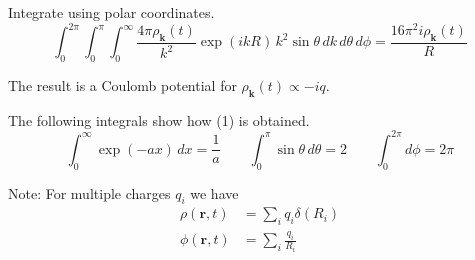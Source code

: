 


\bigskip
Integrate using polar coordinates.
\begin{equation*}
\int_0^{2\pi}\int_0^\pi\int_0^\infty
\frac{4\pi\rho_{\mathbf k}(t)}{k^2}\exp(ikR)\,k^2\sin\theta\,dk\,d\theta\,d\phi
=\frac{16\pi^2i\rho_{\mathbf k}(t)}{R}
\tag{1}
\end{equation*}

The result is a Coulomb potential for
$\rho_{\mathbf k}(t)\propto -iq$.

\bigskip
The following integrals show how (1) is obtained.
\begin{equation*}
\int_0^\infty\exp(-a x)\,dx=\frac{1}{a}
\qquad
\int_0^\pi\sin\theta\,d\theta=2
\qquad
\int_0^{2\pi}d\phi=2\pi
\end{equation*}

Note: For multiple charges $q_i$ we have
\begin{align*}
\rho(\mathbf r,t)&=\sum_iq_i\delta(R_i)
\\
\phi(\mathbf r,t)&=\sum_i\frac{q_i}{R_i}
\end{align*}


